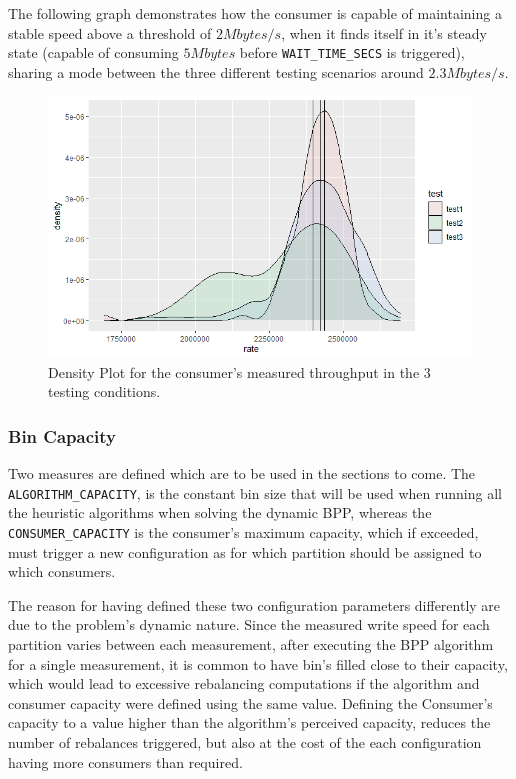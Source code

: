 The following graph demonstrates how the consumer is capable of maintaining a
        stable speed above a threshold of $2 Mbytes/s$, when it finds itself in
        it's steady state (capable of consuming $5 Mbytes$ before
        \lstinline[language=Python]{WAIT_TIME_SECS} is triggered), sharing a
        mode between the three different testing scenarios around $2.3
        Mbytes/s$.

\begin{figure}[H] \centering
\includegraphics[width=\textwidth]{images/consumer/Consumer_Capacity.png}
\caption{Density Plot for the consumer's measured throughput in the 3 testing
conditions.} \label{fig:consumer_capacity} \end{figure}

\subsubsection{Bin Capacity} \label{result:bin capacity}

Two measures are defined which are to be used in the sections to come. The
        \lstinline[language=Python]{ALGORITHM_CAPACITY}, is the constant bin
        size that will be used when running all the heuristic algorithms when
        solving the dynamic BPP, whereas the
        \lstinline[language=Python]{CONSUMER_CAPACITY} is the consumer's maximum
        capacity, which if exceeded, must trigger a new configuration as for
        which partition should be assigned to which consumers.

The reason for having defined these two configuration parameters differently are
        due to the problem's dynamic nature. Since the measured write speed for
        each partition varies between each measurement, after executing the BPP
        algorithm for a single measurement, it is common to have bin's filled
        close to their capacity, which would lead to excessive rebalancing
        computations if the algorithm and consumer capacity were defined using
        the same value. Defining the Consumer's capacity to a value higher than
        the algorithm's perceived capacity, reduces the number of rebalances
        triggered, but also at the cost of the each configuration having more
        consumers than required. 

